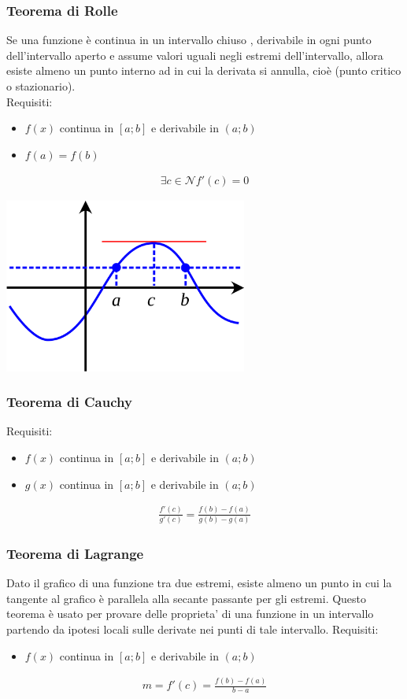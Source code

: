 \documentclass[a4paper]{article}
\begin{document}
	\subsubsection{Teorema di Rolle}
	Se una funzione è continua in un intervallo chiuso , derivabile in ogni punto dell'intervallo aperto e assume valori uguali negli estremi dell'intervallo, allora esiste almeno un punto interno ad in cui la derivata si annulla, cioè (punto critico o stazionario).
	\\Requisiti:
	\begin{itemize}
		\item $f(x)$ continua in $[a;b]$ e derivabile in $(a;b)$
		\item $f(a) = f(b)$
	\end{itemize}
	\begin{align*}
		\exists c \in \mathcal{N} f'(c) = 0
	\end{align*}
	
	\bigskip
	\begin{center}
	\includegraphics[width=8cm]{img/rolle.png}
	\end{center}
	
	\newpage
	\subsubsection{Teorema di Cauchy}
	Requisiti:
	\begin{itemize}
		\item $f(x)$ continua in $[a;b]$ e derivabile in $(a;b)$
		\item $g(x)$ continua in $[a;b]$ e derivabile in $(a;b)$
	\end{itemize}
	\begin{align*}
	\frac{f'(c)}{g'(c)} = \frac{f(b)-f(a)}{g(b)-g(a)}
	\end{align*}
	
	\subsubsection{Teorema di Lagrange}
	Dato il grafico di una funzione tra due estremi, esiste almeno un punto in cui la tangente al grafico è parallela alla secante passante per gli estremi.
	Questo teorema è usato per provare delle proprieta' di una funzione in un intervallo partendo da ipotesi locali sulle derivate nei punti di tale intervallo.
	Requisiti:
	\begin{itemize}
		\item $f(x)$ continua in $[a;b]$ e derivabile in $(a;b)$
	\end{itemize}
	\begin{align*}
	m = f'(c)= \frac{f(b)-f(a)}{b-a}
	\end{align*}
	
\end{document}
